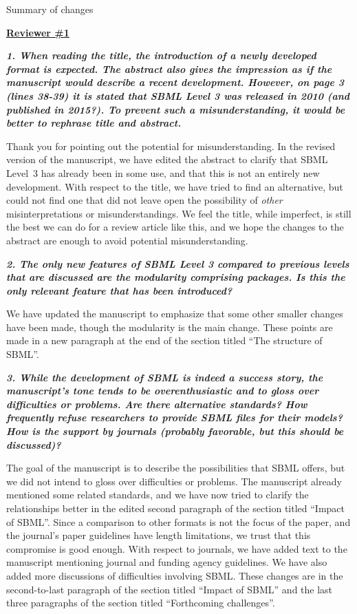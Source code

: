 \documentclass[11pt]{mhletter}
\begin{document}
\clearpage

\begin{center}
\large Summary of changes
\end{center}

\textbf{\underline{Reviewer \#1}}

\textbf{\textit{1. When reading the title, the introduction of a newly developed format is expected. The abstract also gives the impression as if the manuscript would describe a recent development. However, on page 3 (lines 38-39) it is stated that SBML Level 3 was released in 2010 (and published in 2015?). To prevent such a misunderstanding, it would be better to rephrase title and abstract.}}

Thank you for pointing out the potential for misunderstanding.  In the revised version of the manuscript, we have edited the abstract to clarify that SBML Level~3 has already been in some use, and that this is not an entirely new development.  With respect to the title, we have tried to find an alternative, but could not find one that did not leave open the possibility of \emph{other} misinterpretations or misunderstandings.  We feel the title, while imperfect, is still the best we can do for a review article like this, and we hope the changes to the abstract are enough to avoid potential misunderstanding.


\textbf{\textit{2. The only new features of SBML Level 3 compared to previous levels that are discussed are the modularity comprising packages. Is this the only relevant feature that has been introduced?}}

We have updated the manuscript to emphasize that some other smaller changes have been made, though the modularity is the main change.  These points are made in a new paragraph at the end of the section titled ``The structure of SBML''.


\textbf{\textit{3. While the development of SBML is indeed a success story, the manuscript's tone tends to be overenthusiastic and to gloss over difficulties or problems. Are there alternative standards? How frequently refuse researchers to provide SBML files for their models? How is the support by journals (probably favorable, but this should be discussed)?}}

The goal of the manuscript is to describe the possibilities that SBML offers, but we did not intend to gloss over difficulties or problems.  The manuscript already mentioned some related standards, and we have now tried to clarify the relationships better in the edited second paragraph of the section titled ``Impact of SBML''.  Since a comparison to other formats is not the focus of the paper, and the journal's paper guidelines have length limitations, we trust that this compromise is good enough.  With respect to journals, we have added text to the manuscript mentioning journal and funding agency guidelines.  We have also added more discussions of difficulties involving SBML.  These changes are in the second-to-last paragraph of the section titled ``Impact of SBML'' and the last three paragraphs of the section titled ``Forthcoming challenges''.
\end{document}
